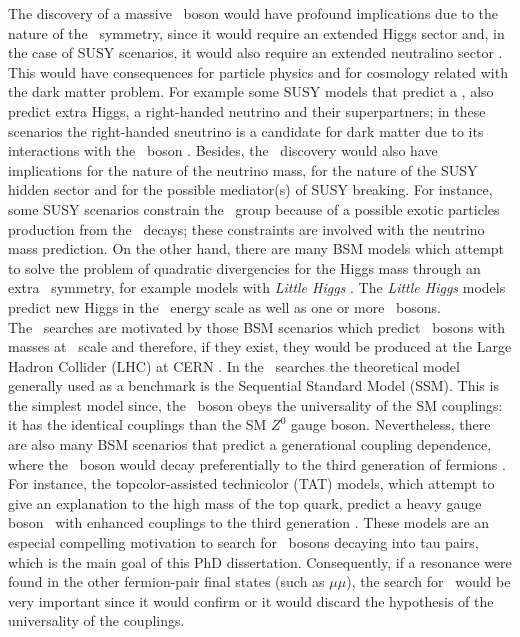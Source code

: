 \noindent The discovery of a massive \Zprime~boson would have profound implications due to the nature of 
the \Uprime~symmetry, since it would require an extended Higgs sector and, in the case 
of SUSY scenarios, it would also require an extended neutralino sector \cite{Langacker:2008yv}. This 
would have consequences for particle physics and for cosmology related with the dark matter problem. For 
example some SUSY models that predict a \Zprime, also predict extra Higgs, a right-handed neutrino and their 
superpartners; in these scenarios the right-handed sneutrino is a candidate for dark matter due to 
its interactions with the \Zprime~boson \cite{TheorySUSY_DM}. Besides, the \Zprime~discovery would also 
have implications for the nature of the neutrino mass, for the nature of the SUSY 
hidden sector and for the possible mediator(s) of SUSY breaking. For instance, some SUSY scenarios
constrain the \Uprime~group because of a possible exotic particles production from the \Zprime~decays; these 
constraints are involved with the neutrino mass prediction. On the other hand, there are many BSM models which attempt to solve the problem of 
quadratic divergencies for  the Higgs mass through an extra \Uprime~symmetry, 
for example models with \emph{Little Higgs} \cite{Langacker:2008yv}. The \emph{Little Higgs} models
predict new Higgs in the \TeV~energy scale as well as one or more \Zprime~bosons. \\

\noindent The \Zprime~searches are motivated by those BSM scenarios which predict \Zprime~bosons 
with masses at \TeV~scale and therefore, if they exist, they would be produced at 
the Large Hadron Collider (LHC) at CERN \cite{Langacker:2008yv}. 
In the \Zprime~searches the theoretical model generally used as a benchmark is the Sequential Standard Model (SSM). 
This is the simplest model since, the \ZprimeSSM~boson obeys the universality of the SM couplings: it has 
the identical couplings than the SM $Z^{0}$ gauge boson. Nevertheless, there are  
also many BSM scenarios that predict a generational coupling dependence, where the \Zprime~boson 
would decay preferentially to the third generation of fermions \cite{ZprimeThirdGeneration}. For instance, the 
topcolor-assisted technicolor (TAT) models, which attempt to give an explanation to the high mass of the top quark,
predict a heavy gauge boson \ZprimeTAT~with enhanced couplings to the third generation \cite{TAT}. These models 
are an especial compelling motivation to search for \Zprime~bosons decaying into tau pairs, which is the main goal of this PhD 
dissertation. Consequently, if a resonance were found in the other fermion-pair final states (such as $\mu\mu$), the search for 
\Zprimetotautau~would be very important since it would confirm or it would discard 
the hypothesis of the universality of the couplings. \\

